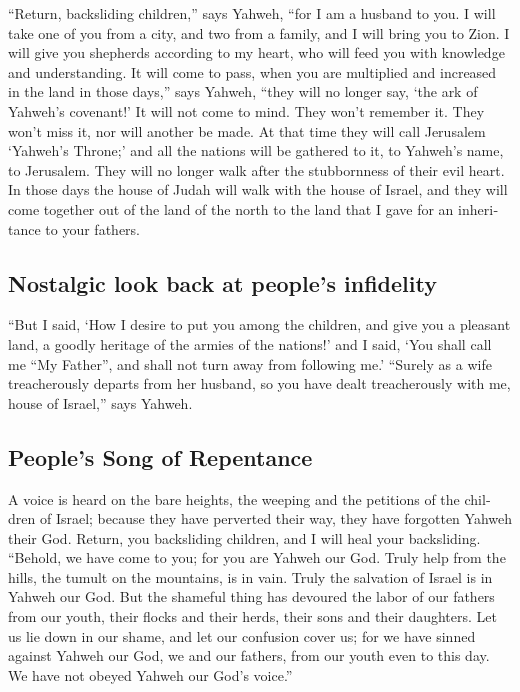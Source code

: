 \begin{paracol}{2}
\begin{otherlanguage}{english}
 ``Return, backsliding children,'' says Yahweh, ``for I
am a husband to you. I will take one of you from a city, and two from a
family, and I will bring you to Zion.  I will give you
shepherds according to my heart, who will feed you with knowledge and
understanding.  It will come to pass, when you are
multiplied and increased in the land in those days,'' says Yahweh,
``they will no longer say, `the ark of Yahweh's covenant!' It will not
come to mind. They won't remember it. They won't miss it, nor will
another be made.  At that time they will call Jerusalem
`Yahweh's Throne;' and all the nations will be gathered to it, to
Yahweh's name, to Jerusalem. They will no longer walk after the
stubbornness of their evil heart.  In those days the
house of Judah will walk with the house of Israel, and they will come
together out of the land of the north to the land that I gave for an
inheritance to your fathers.

\hypertarget{nostalgic-look-back-at-peoples-infidelity}{%
\subsection{Nostalgic look back at people's
infidelity}\label{nostalgic-look-back-at-peoples-infidelity}}

 ``But I said, `How I desire to put you among the
children, and give you a pleasant land, a goodly heritage of the armies
of the nations!' and I said, `You shall call me ``My Father'', and shall
not turn away from following me.'  ``Surely as a wife
treacherously departs from her husband, so you have dealt treacherously
with me, house of Israel,'' says Yahweh.

\hypertarget{peoples-song-of-repentance}{%
\subsection{People's Song of
Repentance}\label{peoples-song-of-repentance}}

 A voice is heard on the bare heights, the weeping and
the petitions of the children of Israel; because they have perverted
their way, they have forgotten Yahweh their God.  Return,
you backsliding children, and I will heal your backsliding. ``Behold, we
have come to you; for you are Yahweh our God.  Truly help
from the hills, the tumult on the mountains, is in vain. Truly the
salvation of Israel is in Yahweh our God.  But the
shameful thing has devoured the labor of our fathers from our youth,
their flocks and their herds, their sons and their daughters.
 Let us lie down in our shame, and let our confusion
cover us; for we have sinned against Yahweh our God, we and our fathers,
from our youth even to this day. We have not obeyed Yahweh our God's
voice.''


\end{otherlanguage}
\end{paracol}
